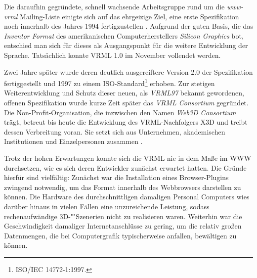 Die daraufhin gegründete, schnell wachsende Arbeitsgruppe rund um die \emph{www-vrml} Mailing-Liste einigte sich auf das ehrgeizige Ziel, eine erste Spezifikation noch innerhalb des Jahres 1994 fertigzustellen \autocite{VRML_10_SPECIFICATION}. Aufgrund der guten Basis, die das \emph{Inventor Format} des amerikanischen Computerherstellers \emph{Silicon Graphics} bot, entschied man sich für dieses als Ausgangspunkt für die weitere Entwicklung der Sprache. Tatsächlich konnte VRML 1.0 im November vollendet werden.

Zwei Jahre später wurde deren deutlich ausgereiftere Version 2.0 der Spezifikation fertiggestellt und 1997 zu einem ISO-Standard\footnote{ISO/IEC 14772-1:1997.} \autocite{VRML_20_ISO} erhoben. Zur stetigen Weiterentwicklung und Schutz dieser neuen, als \emph{VRML97} bekannt gewordenen, offenen Spezifikation wurde kurze Zeit später das \emph{VRML Consortium} gegründet. Die Non-Profit-Organisation, die inzwischen den Namen \emph{Web3D Consortium} trägt, betreut bis heute die Entwicklung des VRML-Nachfolgers X3D und treibt dessen Verbreitung voran. Sie setzt sich aus Unternehmen, akademischen Institutionen und Einzelpersonen zusammen \autocite{WEB3D_CONSORTIUM_ABOUT}.

Trotz der hohen Erwartungen konnte sich die VRML nie in dem Maße im WWW durchsetzen, wie es sich deren Entwickler zunächst erwartet hatten. Die Gründe hierfür sind vielfältig: Zunächst war die Installation eines Browser-Plugins zwingend notwendig, um das Format innerhalb des Webbrowsers darstellen zu können. Die Hardware des durchschnittligen damaligen Personal Computers wies darüber hinaus in vielen Fällen eine unzureichende Leistung, sodass rechenaufwändige 3D-""Szenerien nicht zu realisieren waren. Weiterhin war die Geschwindigkeit damaliger Internetanschlüsse zu gering, um die relativ großen Datenmengen, die bei Computergrafik typischerweise anfallen, bewältigen zu können.
